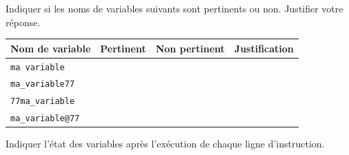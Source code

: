 \documentclass[a4paper,10pt]{report}
\renewcommand{\arraystretch}{1}  %
\def\ptsexoA{2}
\def\ptsexoB{3}
\begin{document}

\renewcommand{\labelitemi}{\textbullet} %


\pagestyle{DS_FP}          %
\NomPrenomNote{}


\exods{\ptsexoA}

Indiquer si les noms de variables suivants sont pertinents ou non. Justifier votre réponse.

\medskip

\renewcommand{\arraystretch}{3.5}
\begin{tabular}{|p{3cm}|p{3cm}|p{3cm}|p{7cm}|}
        \hline
        \textbf{Nom de variable} & \textbf{Pertinent} & \textbf{Non pertinent} &\textbf{Justification} \\ \hline
    \verb|ma variable| &&& \\ \hline
    \verb|ma_variable77|&&& \\ \hline
    \verb|77ma_variable|&&& \\ \hline
    \verb|ma_variable@77|&&& \\ \hline

    \end{tabular}



\bigskip

\exods{\ptsexoB}

    \renewcommand{\arraystretch}{1}

Indiquer l'état des variables après l'exécution de chaque ligne d'instruction.

\medskip
\end{document}
